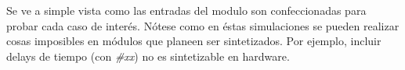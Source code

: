 \documentclass[12pt]{article}
\begin{document}
Se ve a simple vista como las entradas del modulo son confeccionadas para probar cada caso de interés.
Nótese como en éstas simulaciones se pueden realizar cosas imposibles en módulos que planeen ser sintetizados. Por ejemplo, incluir delays de tiempo (con \textit{\#xx}) no es sintetizable en hardware.




\end{document}
